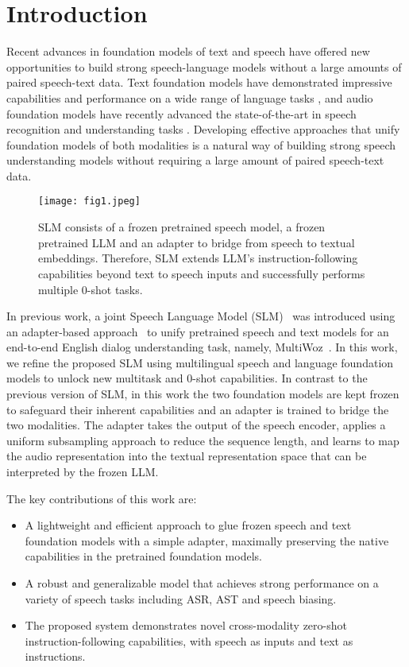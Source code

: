 %
\section{Introduction}
\label{sec:intro}
Recent advances in foundation models of text and speech have offered new opportunities to build strong speech-language models without a large amounts of paired speech-text data. Text foundation models have demonstrated impressive capabilities and performance on a wide range of language tasks \cite{gpt4-technical-report, anil2023palm}, and audio foundation models have recently advanced the state-of-the-art in speech recognition and understanding tasks \cite{zhang2023google, radford2023robust}. Developing effective approaches that unify foundation models of both modalities is a natural way of building strong speech understanding models without requiring a large amount of paired speech-text data.
\begin{figure}[h]
\centering
\texttt{[image: fig1.jpeg]}
\caption{SLM consists of a frozen pretrained speech model, a frozen pretrained LLM and an adapter to bridge from speech to textual embeddings. Therefore, SLM extends LLM's instruction-following capabilities beyond text to speech inputs and successfully performs multiple 0-shot tasks.}
\label{fig:model}
    \vspace*{-0.15in}
\end{figure}

In previous work, a joint Speech Language Model (SLM)~\cite{wang2023speech} was introduced using an adapter-based approach~\cite{houlsby_etal-2019} to unify pretrained speech and text models for an end-to-end English dialog understanding task, namely, MultiWoz~\cite{dstc11}. In this work, we refine the proposed SLM using multilingual speech and language foundation models to unlock new multitask and 0-shot capabilities. In contrast to the previous version of SLM, in this work the two foundation models are kept frozen to safeguard their inherent capabilities and an adapter is trained to bridge the two modalities. The adapter takes the output of the speech encoder, applies a uniform subsampling approach to reduce the sequence length, and learns to map the audio representation into the textual representation space that can be interpreted by the frozen LLM. 

The key contributions of this work are:

\begin{itemize}
    \item A lightweight and efficient approach to glue frozen speech and text foundation models with a simple adapter, maximally preserving the native capabilities in the pretrained foundation models.
    \item A robust and generalizable model that achieves strong performance on a variety of speech tasks including ASR, AST and speech biasing.
    \item The proposed system demonstrates novel cross-modality zero-shot instruction-following capabilities, with speech as inputs and text as instructions.
\end{itemize}

